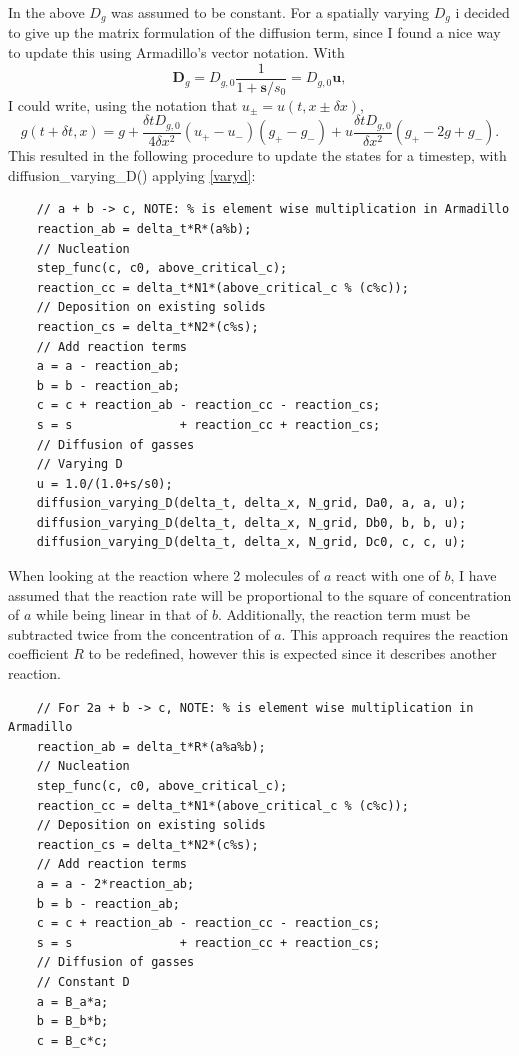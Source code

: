 \documentclass[1p]{elsarticle}        	%
\begin{document}
In the above $D_g$ was assumed to be constant. For a spatially varying $D_g$ i decided to give up the matrix formulation of the diffusion term, since I found a nice way to update this using Armadillo's vector notation.
With 
\begin{equation}
\mathbf{D}_g = D_{g,0} \frac{1}{1+\mathbf{s}/s_0} = D_{g,0} \mathbf{u},
\end{equation}
I could write, using the notation that $u_\pm = u(t,x \pm \delta x)$,
\begin{equation}
g(t+\delta t, x) = g +  \frac{\delta t D_{g,0}}{4\delta x^2} (u_+ - u_-)( g_+ - g_-) + u \frac{\delta t D_{g,0}}{\delta x^2}(g_+ -2g + g_-).
\label{varyd}
\end{equation}
This resulted in the following procedure to update the states for a timestep, with diffusion\_varying\_D() applying \eqref{varyd}:
\begin{lstlisting}
    // a + b -> c, NOTE: % is element wise multiplication in Armadillo
    reaction_ab = delta_t*R*(a%b);
    // Nucleation
    step_func(c, c0, above_critical_c);
    reaction_cc = delta_t*N1*(above_critical_c % (c%c));
    // Deposition on existing solids
    reaction_cs = delta_t*N2*(c%s);
    // Add reaction terms
    a = a - reaction_ab;
    b = b - reaction_ab;
    c = c + reaction_ab - reaction_cc - reaction_cs;
    s = s               + reaction_cc + reaction_cs;
    // Diffusion of gasses
    // Varying D
    u = 1.0/(1.0+s/s0);
    diffusion_varying_D(delta_t, delta_x, N_grid, Da0, a, a, u);
    diffusion_varying_D(delta_t, delta_x, N_grid, Db0, b, b, u);
    diffusion_varying_D(delta_t, delta_x, N_grid, Dc0, c, c, u);
\end{lstlisting}

When looking at the reaction where 2 molecules of $a$ react with one of $b$, I have assumed that the reaction rate will be proportional to the square of concentration of  $a$ while being linear in that of $b$. Additionally, the reaction term must be subtracted twice from the concentration of $a$. This approach requires the reaction coefficient $R$ to be redefined, however this is expected since it describes another reaction.
\begin{lstlisting}
    // For 2a + b -> c, NOTE: % is element wise multiplication in Armadillo
    reaction_ab = delta_t*R*(a%a%b);
    // Nucleation
    step_func(c, c0, above_critical_c);
    reaction_cc = delta_t*N1*(above_critical_c % (c%c));
    // Deposition on existing solids
    reaction_cs = delta_t*N2*(c%s);
    // Add reaction terms
    a = a - 2*reaction_ab;
    b = b - reaction_ab;
    c = c + reaction_ab - reaction_cc - reaction_cs;
    s = s               + reaction_cc + reaction_cs;
    // Diffusion of gasses
    // Constant D
    a = B_a*a;
    b = B_b*b;
    c = B_c*c;
\end{lstlisting}
\end{document}
